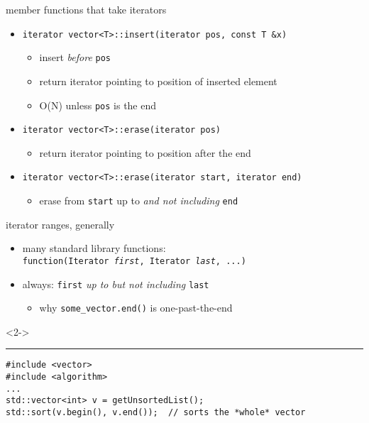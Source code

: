 \begin{frame}[fragile,label=moreItMethods]{member functions that take iterators}
\lstset{
    language=C++,
    style=smaller
}
\begin{itemize}
\item \lstinline|iterator vector<T>::insert(iterator pos, const T &x)|
\begin{itemize}
    \item insert \textit{before} \texttt{pos}
    \item return iterator pointing to position of inserted element
    \item O(N) unless \texttt{pos} is the end
\end{itemize}
\item \lstinline|iterator vector<T>::erase(iterator pos)| 
    \begin{itemize}
    \item return iterator pointing to position after the end
    \end{itemize}
\item \lstinline|iterator vector<T>::erase(iterator start, iterator end)| 
    \begin{itemize}
        \item erase from \texttt{start} up to \textit{and not including} \texttt{end}
    \end{itemize}
\end{itemize}
\end{frame}

\begin{frame}[fragile,label=itRange]{iterator ranges, generally}
\begin{itemize}
    \item many standard library functions: \\
        \texttt{function(Iterator \textit{first}, Iterator \textit{last}, ...)}
    \item always: \texttt{first} \textit{up to but not including} \texttt{last}
        \begin{itemize}
        \item why {\tt some\_vector.end()} is one-past-the-end
        \end{itemize}
\end{itemize}
\begin{visibleenv}<2->
\hrule
\lstset{language=C++,style=small}
\begin{lstlisting}
#include <vector>
#include <algorithm>
...
std::vector<int> v = getUnsortedList();
std::sort(v.begin(), v.end());  // sorts the *whole* vector
\end{lstlisting}
\end{visibleenv}
\end{frame}

